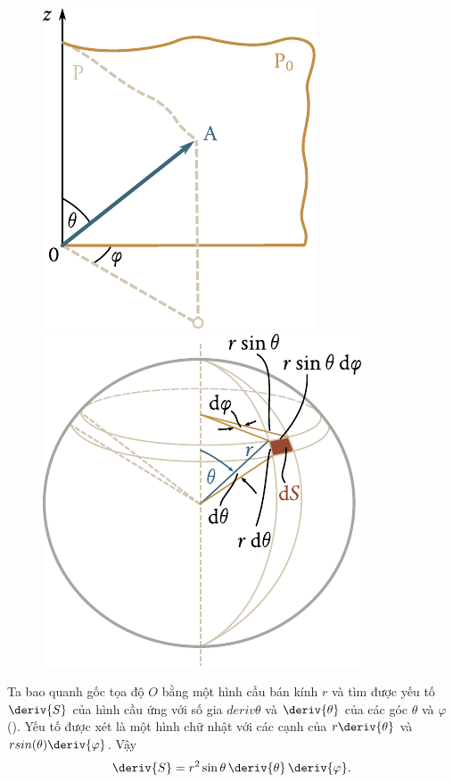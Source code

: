 \begin{figure}[!htb]
	\begin{minipage}[t]{0.5\linewidth}
		\begin{center}
			\includegraphics[scale=1.0]{figures/ch_11/fig_11_3.pdf}
			\caption[]{}
			\label{fig:11_3}
		\end{center}
	\end{minipage}
	\hspace{-0.05cm}
	\begin{minipage}[t]{0.5\linewidth}
		\begin{center}
			\includegraphics[scale=1.0]{figures/ch_11/fig_11_4.pdf}
			\caption[]{}
			\label{fig:11_4}
		\end{center}
	\end{minipage}
	\vspace{-0.4cm}
\end{figure}
Ta bao quanh gốc tọa độ $O$ bằng một hình cầu bán kính $r$ và tìm được yếu tố $\deriv{S}$ của hình cầu ứng với số gia $deriv{\theta}$ và $\deriv{\theta}$ của các góc $\theta$ và $\varphi$ (). Yếu tố được xét là một hình chữ nhật với các cạnh của $r\deriv{\theta}$ và $rsin(\theta)\deriv{\varphi}$. Vậy
\begin{equation}\label{eq:11_14}
	\deriv{S} = r^2 \sin\theta\,\deriv{\theta}\,\deriv{\varphi}.
\end{equation}

